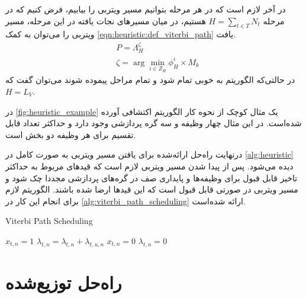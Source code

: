	در آخر لازم است که در هر مرحله بتوانیم مسیر ویتربی را بیابیم، فرض کنیم که در مرحله $\displaystyle H = \sum_{t \in T}N_t$ هستیم، در میان مسیرهای نجات یافته در این مرحله، مسیر ویتربی را می‌توان به کمک \cref{eqn:heuristic:def_viterbi_path} یافت.
\begin{subequations}
	\begin{align}\label{eqn:heuristic:def_viterbi_path}
		&P = \Lambda_H^\zeta \\
		&\zeta = \arg \min_{i \in Z_H} \phi_H^i \times M_k
	\end{align}
\end{subequations}
در حالتی‌که الگوریتم به خوبی تمام شود و تمام مراحل پیموده شوند می‌توان گفت که $H=L_V$.

در \cref{fig:heuristic_example} یک مثال کوچک از نحوه کار الگوریتم اکتشافی آورده شده‌است. در این مثال چهار وظیفه و سه گره پردازشی وجود دارد و حداکثر تعداد قابل تقسیم برای هر وظیفه دو بخش است.

درنهایت راه‌حل ارائه‌شده برای یافتن مسیر ویتربی به صورت کامل در \cref{alg:heuristic} دیده می‌شود. پس‌ از پیدا شدن مسیر ویتربی لازم است که قیدهای مربوط به حداکثر تاخیر قابل قبول برای وظیفه‌ها و پایداری صف در گره‌های پردازشی مجددا چک شود و مسیر ویتربی در صورتی قابل قبول است که این قیدها ارضا شده باشند. الگوریتم لازم برای انجام این کار در \cref{alg:viterbi_path_scheduling} ارا‌ئه شده‌است. 

\begin{latin}
	\begin{algorithm}
		\caption{Viterbi Path Scheduling}
		\label{alg:viterbi_path_scheduling}
		\begin{algorithmic}[1]
					\State $x_{t,n} = 1$
					\State $\lambda_{t,n} = \lambda_{t,n} + \lambda_{t,u,n}$
				\EndIf
					\State $x_{t,n} = 0$
					\State $\lambda_{t,n} = 0$
				\EndIf
			\EndFor
		\end{algorithmic}
	\end{algorithm}
\end{latin}

\section{راه‌حل توزیع‌شده}\label{subsection:distributed}

